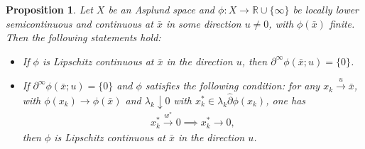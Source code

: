 \documentclass[12pt,twoside,reqno]{amsart}
\newtheorem{proposition}[theorem]{Proposition}
\theoremstyle{definition}
\numberwithin{equation}{section}
\begin{document}
\begin{proposition}\label{prop:singular_subdiff_Lipschitz}
Let $X$ be an Asplund space and $\phi: X \to \mathbb{R} \cup \{\infty\}$ be locally lower semicontinuous and continuous at $\bar{x}$ in some direction $u \neq 0$, with $\phi(\bar{x})$ finite. Then the following statements hold:
\begin{itemize}
    \item[\rm(i)] If $\phi$ is Lipschitz continuous at $\bar{x}$ in the direction $u$, then $\partial^{\infty} \phi(\bar{x}; u) = \{0\}$.
    \item[\rm(ii)] If $\partial^{\infty} \phi(\bar{x}; u) = \{0\}$ and $\phi$ satisfies the following condition: for any $x_k\xrightarrow{u} \bar x$, with $\phi(x_k)\to \phi(\bar x)$ and $\lambda_k \downarrow 0$ with $x_k^*\in \lambda_k \hat{\partial} \phi(x_k)$, one has 
    \begin{equation*}
        \begin{split}
            x_k^*\xrightarrow{w^*} 0 \implies x_k^* \to 0,  
        \end{split}
    \end{equation*}
    then $\phi$ is Lipschitz continuous at $\bar{x}$ in the direction $u$. 
\end{itemize}
\end{proposition}
\end{document}
